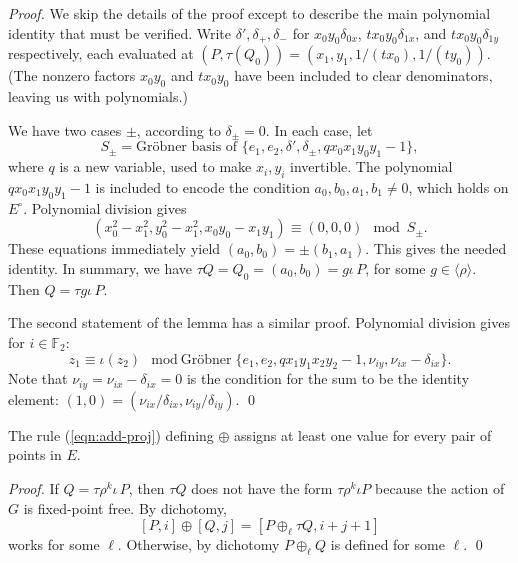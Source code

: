 \documentclass{llncs}
\newcommand{\ring}[1]{\mathbb{#1}}
\newcommand{\Eoo}{E^{\circ}} %
\newcommand{\Go}{\langle\rho\rangle}
\begin{document}
\begin{proof}  We skip the details of the proof except to describe
the main polynomial identity that must be verified.
Write $\delta',\delta_{+},\delta_{-}$ for $x_0 y_0\delta_{0x}$, $t x_0
y_0\delta_{1x}$, and $t x_0 y_0 \delta_{1y}$ respectively, each
evaluated at $(P,\tau(Q_0))=(x_1,y_1,1/(t x_0),1/(t y_0))$.  (The
nonzero factors $x_0y_0$ and $t x_0 y_0$ have been included to clear
denominators, leaving us with polynomials.)

We have two cases $\pm$, according to $\delta_{\pm}=0$.  In each case,
let
\[
S_\pm = \text{Gr\"obner basis of } \{e_1,e_2, 
\delta',\delta_{\pm},q x_0 x_1 y_0 y_1 - 1\},
\]
where $q$ is a new variable, used to make $x_i,y_i$ invertible.
The polynomial $q x_0 x_1 y_0 y_1-1$ is included to encode the
condition $a_0,b_0,a_1,b_1\ne 0$, which holds on $\Eoo$.  Polynomial
division gives
\begin{equation}\label{eqn:dichot}
(x_0^2-x_1^2,y_0^2-x_1^2,x_0 y_0 - x_1 y_1) \equiv (0,0,0) \mod S_\pm.
\end{equation}
These equations immediately yield $(a_0,b_0) = \pm (b_1,a_1)$.  
This gives the needed identity.  In summary, we have $\tau Q =
Q_0 = (a_0,b_0) = g \iota\,P$, for some $g\in \Go$.  Then $Q = \tau g
\iota\,P$.

The second statement of the lemma has a similar proof.  Polynomial
division gives for $i\in \ring{F}_2$:
\[
z_1 \equiv \iota (z_2) \mod \text{Gr\"obner} 
\{ e_1,e_2,q x_1 y_1 x_2 y_2 -1,\nu_{i y},\nu_{i x}-\delta_{i x} \}.
\]
Note that $\nu_{i y}=\nu_{i x}-\delta_{i x}=0$ is the condition for
the sum to be the identity element:
$(1,0)=(\nu_{ix}/\delta_{ix},\nu_{iy}/\delta_{iy})$.
\qed\end{proof}

\begin{lemma}[covering] The rule (\ref{eqn:add-proj}) defining
  $\oplus$ assigns at least one value for every pair of points in $E$.
\end{lemma}

\begin{proof} If $Q=\tau \rho^k \iota\,P$, then $\tau Q$ does not have
  the form $\tau\rho^k\iota P$ because the action of $G$ is
  fixed-point free.  By dichotomy,
\begin{equation}\label{eqn:tt}
[P,i]\oplus [Q,j] = [P\oplus_\ell \tau Q,i+j+1]
\end{equation}
works for some $\ell$.  Otherwise, by dichotomy $P\oplus_\ell Q$ is
defined for some $\ell$.
\qed\end{proof}
\end{document}
